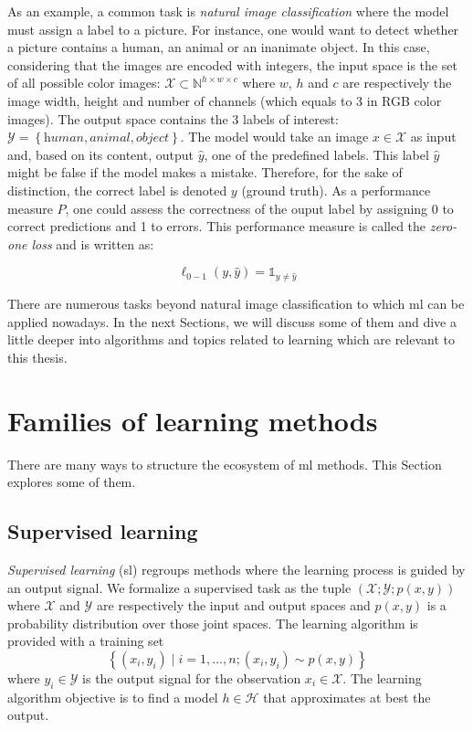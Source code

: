 As an example, a common task is \textit{natural image classification} where the model must assign a label to a picture. For instance, one would want to detect whether a picture contains a human, an animal or an inanimate object. In this case, considering that the images are encoded with integers, the input space is the set of all possible color images: $\mathcal{X} \subset \mathbb{N}^{h\times w\times c}$ where $w$, $h$ and $c$ are respectively the image width, height and number of channels (which equals to 3 in RGB color images). The output space contains the 3 labels of interest: $\mathcal{Y} = \left\{\textit{human}, \textit{animal}, \textit{object}\right\}$. The model would take an image $x \in \mathcal{X}$ as input and, based on its content, output $\hat{y}$, one of the predefined labels. This label $\hat{y}$ might be false if the model makes a mistake. Therefore, for the sake of distinction, the correct label is denoted $y$ (\aka ground truth). As a performance measure $P$, one could assess the correctness of the ouput label by assigning 0 to correct predictions and 1 to errors. This performance measure is called the \textit{zero-one loss} and is written as:

\begin{equation}
\ell_{0-1}(y, \hat{y}) = \mathbb{1}_{y\neq\hat{y}}
\end{equation}

There are numerous tasks beyond natural image classification to which \acrlong{ml} can be applied nowadays. In the next Sections, we will discuss some of them and dive a little deeper into algorithms and topics related to learning which are relevant to this thesis.


\section{Families of learning methods}
\label{sec:backml:families}

There are many ways to structure the ecosystem of \acrlong{ml} methods. This Section explores some of them.

\subsection{Supervised learning}
\label{ssec:backml:sl}

\textit{Supervised learning} (\acrshort{sl}) regroups methods where the learning process is guided by an output signal. We formalize a supervised task as the tuple $\left(\mathcal{X}; \mathcal{Y}; p(x, y)\right)$ where $\mathcal{X}$ and $\mathcal{Y}$ are respectively the input and output spaces and $p(x, y)$ is a probability distribution over those joint spaces. The learning algorithm is provided with a training set 
\begin{equation}
\label{eqn:backml:supervised}
\left\{(x_i, y_i) \mid i = 1,...,n ; (x_i, y_i) \sim p(x, y) \right\}
\end{equation}
where $y_i \in \mathcal{Y}$ is the output signal for the observation $x_i \in \mathcal{X}$. The learning algorithm objective is to find a model $h \in \mathcal{H}$ that approximates at best the output. 

